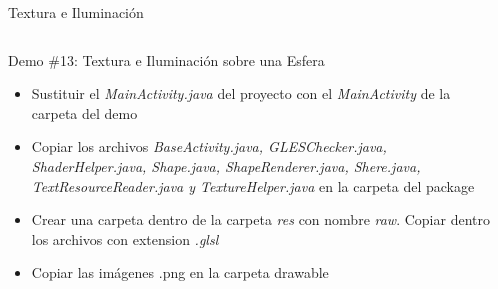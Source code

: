 \documentclass[aspectratio=169,compress]{beamer}
\begin{document}
\begin{frame}{Textura e Iluminación}
\begin{columns}
\begin{column}{0.7\textwidth}
\begin{block}{Demo \#13: Textura e Iluminación sobre una Esfera}
\begin{itemize}
\item Sustituir el \textit{MainActivity.java} del proyecto con el \textit{MainActivity} de la carpeta del demo
\item Copiar los archivos \textit{BaseActivity.java, GLESChecker.java, ShaderHelper.java, Shape.java, ShapeRenderer.java, Shere.java, TextResourceReader.java y TextureHelper.java} en la carpeta del package
\item Crear una carpeta dentro de la carpeta \textit{res} con nombre \textit{raw}. Copiar dentro los archivos con extension \textit{.glsl}
\item Copiar las imágenes .png en la carpeta drawable 
\end{itemize}
\end{block}
\end{column}
\begin{column}{0.3\textwidth}
\begin{center}

\end{center}
\end{column}
\end{columns}
\end{frame}
\end{document}
